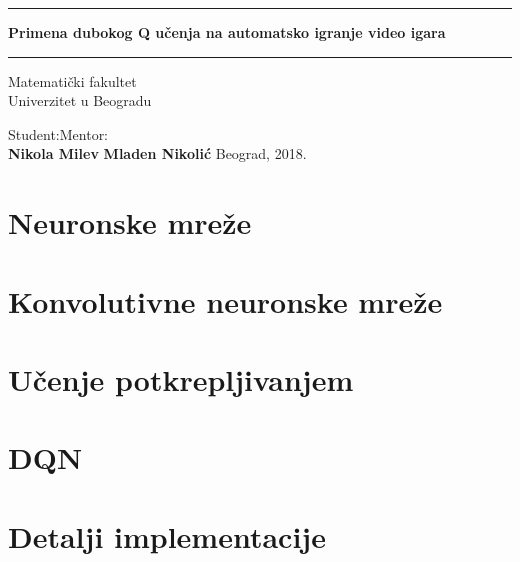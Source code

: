 \documentclass{report}
\begin{document}
\begin{titlepage}
    \begin{center}
        \vspace*{1cm}
        \hrule
        \vspace*{1cm}
        \textbf{Primena dubokog Q učenja na automatsko igranje video igara}
        \vspace*{1cm}
        \hrule
        \vspace{1cm}
        \begin{center}
        	Matematički fakultet \\
        	Univerzitet u Beogradu
        \end{center}
        \vspace{1.5cm}
        Student:\hfill Mentor:\\
        \textbf{Nikola Milev}
		\hfill        
        \textbf{Mladen Nikolić}
        \vfill
		Beograd, 2018.
    \end{center}
\end{titlepage}


\tableofcontents{}
\newpage




\chapter{Neuronske mreže}
\chapter{Konvolutivne neuronske mreže}
\chapter{Učenje potkrepljivanjem}
\chapter{DQN}
\chapter{Detalji implementacije}
\end{document}
